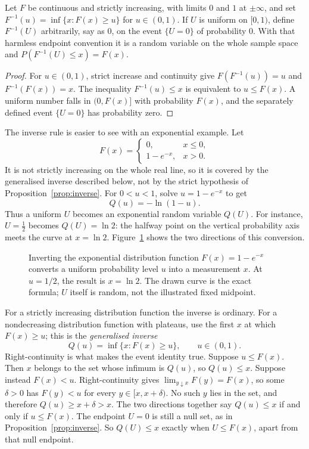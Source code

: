 \begin{proposition}\label{prop:inverse}
Let $F$ be continuous and strictly increasing, with limits $0$ and $1$ at $\pm\infty$, and set $F^{-1}(u)=\inf\{x:F(x)\ge u\}$ for $u\in(0,1)$. If $U$ is uniform on $[0,1)$, define $F^{-1}(U)$ arbitrarily, say as $0$, on the event $\{U=0\}$ of probability $0$. With that harmless endpoint convention it is a random variable on the whole sample space and $P(F^{-1}(U)\le x)=F(x)$.
\end{proposition}
\begin{proof}
For $u\in(0,1)$, strict increase and continuity give $F(F^{-1}(u))=u$ and $F^{-1}(F(x))=x$. The inequality $F^{-1}(u)\le x$ is equivalent to $u\le F(x)$. A uniform number falls in $(0,F(x)]$ with probability $F(x)$, and the separately defined event $\{U=0\}$ has probability zero.
\end{proof}

The inverse rule is easier to see with an exponential example. Let
\[
 F(x)=
 \begin{cases}
  0,&x\le0,\\
  1-e^{-x},&x>0.
 \end{cases}
\]
It is not strictly increasing on the whole real line, so it is covered by the generalised inverse described below, not by the strict hypothesis of Proposition~\ref{prop:inverse}. For $0<u<1$, solve $u=1-e^{-x}$ to get
\[
 Q(u)=-\ln(1-u).
\]
Thus a uniform $U$ becomes an exponential random variable $Q(U)$. For instance, $U=\frac12$ becomes $Q(U)=\ln2$: the halfway point on the vertical probability axis meets the curve at $x=\ln2$. Figure~\ref{fig:inversecdf} shows the two directions of this conversion.

\begin{figure}[ht]
\centering
{}
\caption{Inverting the exponential distribution function $F(x)=1-e^{-x}$ converts a uniform probability level $u$ into a measurement $x$. At $u=1/2$, the result is $x=\ln2$. The drawn curve is the exact formula; $U$ itself is random, not the illustrated fixed midpoint.}
\label{fig:inversecdf}
\end{figure}

For a strictly increasing distribution function the inverse is ordinary. For a nondecreasing distribution function with plateaus, use the first $x$ at which $F(x)\ge u$; this is the \emph{generalised inverse}
\[
 Q(u)=\inf\{x:F(x)\ge u\},\qquad u\in(0,1).
\]
Right-continuity is what makes the event identity true. Suppose $u\le F(x)$. Then $x$ belongs to the set whose infimum is $Q(u)$, so $Q(u)\le x$. Suppose instead $F(x)<u$. Right-continuity gives $\lim_{y\downarrow x}F(y)=F(x)$, so some $\delta>0$ has $F(y)<u$ for every $y\in[x,x+\delta)$. No such $y$ lies in the set, and therefore $Q(u)\ge x+\delta>x$. The two directions together say $Q(u)\le x$ if and only if $u\le F(x)$. The endpoint $U=0$ is still a null set, as in Proposition~\ref{prop:inverse}. So $Q(U)\le x$ exactly when $U\le F(x)$, apart from that null endpoint.

